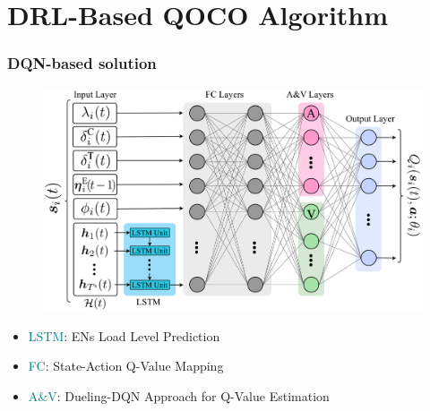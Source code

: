 \section{DRL-Based QOCO Algorithm}

\begin{frame}
	\frametitle{DQN-based solution}
	\begin{figure}
	\captionsetup{name=Fig.}
	\centering
	\includegraphics[width=0.9\linewidth]{DQN}
	\vspace*{-5mm}
	\vspace*{-3mm}
	\label{fig1}
\end{figure}
	
	\vspace{6mm}
	
	\begin{itemize}[]
	
	\item  \hspace{0mm}  \textcolor{teal}{LSTM}: ENs Load Level Prediction
	
	\item  \hspace{0mm}  \textcolor{teal}{FC}: State-Action Q-Value Mapping
	
	
	\item \hspace{0mm}  \textcolor{teal}{A\&V}: Dueling-DQN Approach for Q-Value Estimation
	
	
	
	
\end{itemize}

	
\end{frame}


